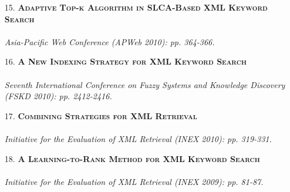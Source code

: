 \documentclass[a4paper, 11pt]{article}
\begin{document}
\begin{itemize}
\item[\color{bl3} 15.]{\scshape\color{bl3}\bf Adaptive Top-k Algorithm in SLCA-Based XML Keyword Search}\\
\\
\emph{ Asia-Pacific Web Conference (APWeb 2010): pp. 364-366.}
\vspace{2mm}

\item[\color{bl3} 16.]{\scshape\color{bl3}\bf A New Indexing Strategy for XML Keyword Search}\\
\\
\emph{ Seventh International Conference on Fuzzy Systems and Knowledge Discovery (FSKD 2010): pp. 2412-2416.}
\vspace{2mm}

\item[\color{bl3} 17.]{\scshape\color{bl3}\bf Combining Strategies for XML Retrieval}\\
\\
\emph{ Initiative for the Evaluation of XML Retrieval (INEX 2010): pp. 319-331.}\\
\color{red}{\bf (INEX 2010 Best Student Paper Award)}
\vspace{2mm}


\item[\color{bl3} 18.]{\scshape\color{bl3}\bf A Learning-to-Rank Method for XML Keyword Search}\\
\\
\emph{ Initiative for the Evaluation of XML Retrieval (INEX 2009): pp. 81-87.}

 \end{itemize}        
\end{document}
